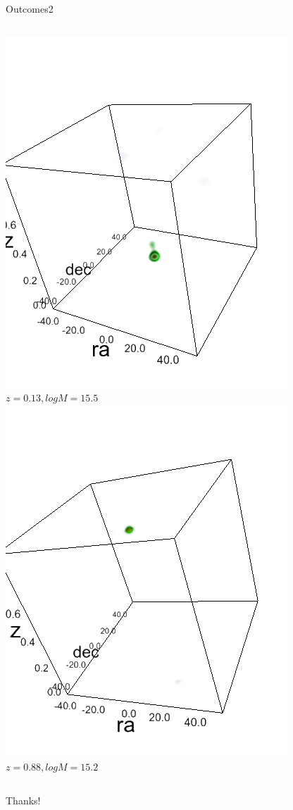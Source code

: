 \documentclass[10pt]{beamer}
\begin{document}
\begin{frame}{Outcomes2}
\begin{columns}
\begin{column}{0.32\textwidth}
\includegraphics[height=.9\textwidth]{./tau20spect-z2-m8.png}
$z=0.13, logM=15.5$
\includegraphics[height=.9\textwidth]{./tau20spect-z7-m7.png}
$z=0.88, logM=15.2$
\end{column}
\end{columns}
\end{frame}


\begin{frame}{}
Thanks!
\end{frame}
\end{document}
